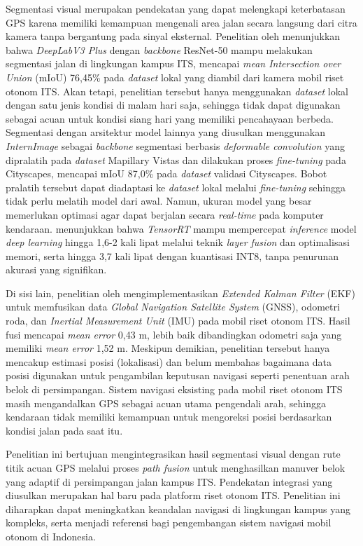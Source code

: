 Segmentasi visual merupakan pendekatan yang dapat melengkapi keterbatasan GPS karena memiliki kemampuan mengenali area jalan secara langsung dari citra kamera tanpa bergantung pada sinyal eksternal.
Penelitian oleh \textcite{Dharma2025PerformanceEvaluation} menunjukkan bahwa \emph{DeepLabV3 Plus} dengan \emph{backbone} ResNet-50 mampu melakukan segmentasi jalan di lingkungan kampus ITS, mencapai \emph{mean Intersection over Union} (mIoU) 76,45\% pada \emph{dataset} lokal yang diambil dari kamera mobil riset otonom ITS.
Akan tetapi, penelitian tersebut hanya menggunakan \emph{dataset} lokal dengan satu jenis kondisi di malam hari saja, sehingga tidak dapat digunakan sebagai acuan untuk kondisi siang hari yang memiliki pencahayaan berbeda.
Segmentasi dengan arsitektur model lainnya yang diusulkan \textcite{wang2023internimage} menggunakan \emph{InternImage} sebagai \emph{backbone} segmentasi berbasis \emph{deformable convolution} yang dipralatih pada \emph{dataset} Mapillary Vistas dan dilakukan proses \emph{fine-tuning} pada Cityscapes, mencapai mIoU 87,0\% pada \emph{dataset} validasi Cityscapes.
Bobot pralatih tersebut dapat diadaptasi ke \emph{dataset} lokal melalui \emph{fine-tuning} sehingga tidak perlu melatih model dari awal.
Namun, ukuran model yang besar memerlukan optimasi agar dapat berjalan secara \emph{real-time} pada komputer kendaraan.
\textcite{zhou2022exploring} menunjukkan bahwa \emph{TensorRT} mampu mempercepat \emph{inference} model \emph{deep learning} hingga 1,6-2 kali lipat melalui teknik \emph{layer fusion} dan optimalisasi memori, serta hingga 3,7 kali lipat dengan kuantisasi INT8, tanpa penurunan akurasi yang signifikan.

Di sisi lain, penelitian oleh \textcite{Zazuli2024SensorFusion} mengimplementasikan \emph{Extended Kalman Filter} (EKF) untuk memfusikan data \emph{Global Navigation Satellite System} (GNSS), odometri roda, dan \emph{Inertial Measurement Unit} (IMU) pada mobil riset otonom ITS.
Hasil fusi mencapai \emph{mean error} 0,43 m, lebih baik dibandingkan odometri saja yang memiliki \emph{mean error} 1,52 m.
Meskipun demikian, penelitian tersebut hanya mencakup estimasi posisi (lokalisasi) dan belum membahas bagaimana data posisi digunakan untuk pengambilan keputusan navigasi seperti penentuan arah belok di persimpangan.
Sistem navigasi eksisting pada mobil riset otonom ITS masih mengandalkan GPS sebagai acuan utama pengendali arah, sehingga kendaraan tidak memiliki kemampuan untuk mengoreksi posisi berdasarkan kondisi jalan pada saat itu.

Penelitian ini bertujuan mengintegrasikan hasil segmentasi visual dengan rute titik acuan GPS melalui proses \emph{path fusion} untuk menghasilkan manuver belok yang adaptif di persimpangan jalan kampus ITS.
Pendekatan integrasi yang diusulkan merupakan hal baru pada platform riset otonom ITS.
Penelitian ini diharapkan dapat meningkatkan keandalan navigasi di lingkungan kampus yang kompleks, serta menjadi referensi bagi pengembangan sistem navigasi mobil otonom di Indonesia.

